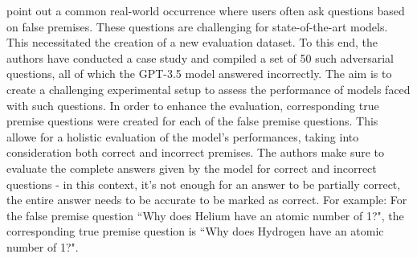 
\citet{varshney2023stitch} point out a common real-world occurrence where users often ask questions based on false premises. These questions are challenging for state-of-the-art models.
This necessitated the creation of a new evaluation dataset. To this end, the authors have conducted a case study and compiled a set of 50 such adversarial questions, all of which the GPT-3.5 model answered incorrectly. The aim is to create a challenging experimental setup to assess the performance of models faced with such questions.
In order to enhance the evaluation, corresponding true premise questions were created for each of the false premise questions. This allowe for a holistic evaluation of the model's performances, taking into consideration both correct and incorrect premises.
The authors make sure to evaluate the complete answers given by the model for correct and incorrect questions - in this context, it's not enough for an answer to be partially correct, the entire answer needs to be accurate to be marked as correct. For example: For the false premise question ``Why does Helium have an atomic number of 1?", the corresponding true premise question is ``Why does Hydrogen have an atomic number of 1?".


